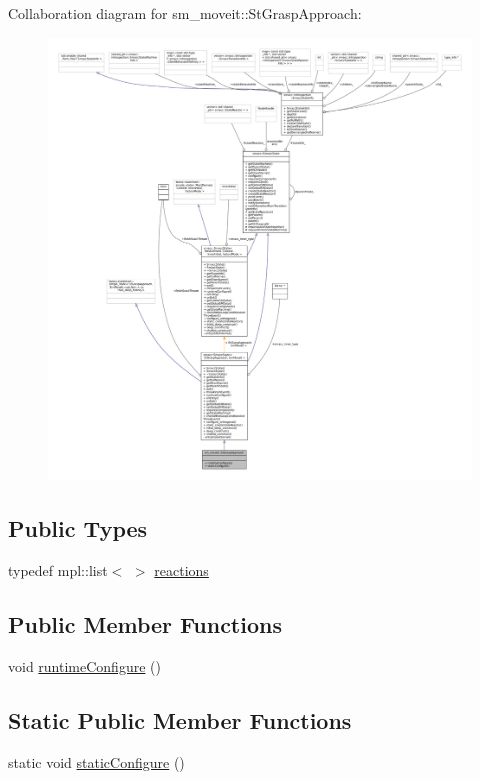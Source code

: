 Collaboration diagram for sm\+\_\+moveit\+:\+:St\+Grasp\+Approach\+:
\nopagebreak
\begin{figure}[H]
\begin{center}
\leavevmode
\includegraphics[width=350pt]{structsm__moveit_1_1StGraspApproach__coll__graph}
\end{center}
\end{figure}
\subsection*{Public Types}
\begin{DoxyCompactItemize}
\item 
typedef mpl\+::list$<$  $>$ \hyperlink{structsm__moveit_1_1StGraspApproach_a52b08f39bf69656abdbeec7be5dabfa9}{reactions}
\end{DoxyCompactItemize}
\subsection*{Public Member Functions}
\begin{DoxyCompactItemize}
\item 
void \hyperlink{structsm__moveit_1_1StGraspApproach_a17c72bb0cad450a75b37b8581c9767d6}{runtime\+Configure} ()
\end{DoxyCompactItemize}
\subsection*{Static Public Member Functions}
\begin{DoxyCompactItemize}
\item 
static void \hyperlink{structsm__moveit_1_1StGraspApproach_a0a650ab45c51ca1de29b0614e46765d1}{static\+Configure} ()
\end{DoxyCompactItemize}
